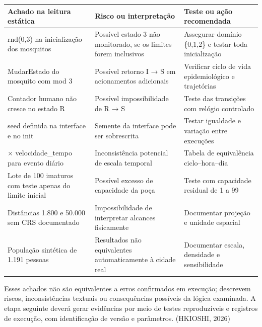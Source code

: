 \begin{longtable}[]{@{}
  >{\raggedright\arraybackslash}p{}
  >{\raggedright\arraybackslash}p{}
  >{\raggedright\arraybackslash}p{}@{}}
\toprule\noalign{}
\begin{minipage}[b]{\linewidth}\raggedright
\textbf{Achado na leitura estática}
\end{minipage} & \begin{minipage}[b]{\linewidth}\raggedright
\textbf{Risco ou interpretação}
\end{minipage} & \begin{minipage}[b]{\linewidth}\raggedright
\textbf{Teste ou ação recomendada}
\end{minipage} \\
\midrule\noalign{}
\endhead
\bottomrule\noalign{}
\endlastfoot
rnd(0,3) na inicialização dos mosquitos & Possível estado 3 não
monitorado, se os limites forem inclusivos & Assegurar domínio \{0,1,2\}
e testar toda inicialização \\
MudarEstado do mosquito com mod 3 & Possível retorno I → S em
acionamentos adicionais & Verificar ciclo de vida epidemiológico e
trajetórias \\
Contador humano não cresce no estado R & Possível impossibilidade de R →
S & Teste das transições com relógio controlado \\
seed definida na interface e no init & Semente da interface pode ser
sobrescrita & Testar igualdade e variação entre execuções \\
240 × velocidade\_tempo para evento diário & Inconsistência potencial de
escala temporal & Tabela de equivalência ciclo--hora--dia \\
Lote de 100 imaturos com teste apenas do limite inicial & Possível
excesso de capacidade da poça & Teste com capacidade residual de 1 a
99 \\
Distâncias 1.800 e 50.000 sem CRS documentado & Impossibilidade de
interpretar alcances fisicamente & Documentar projeção e unidade
espacial \\
População sintética de 1.191 pessoas & Resultados não equivalentes
automaticamente à cidade real & Documentar escala, densidade e
sensibilidade \\
\end{longtable}

Esses achados não são equivalentes a erros confirmados em execução;
descrevem riscos, inconsistências textuais ou consequências possíveis da
lógica examinada. A etapa seguinte deverá gerar evidências por meio de
testes reproduzíveis e registros de execução, com identificação de
versão e parâmetros. (HKIOSHI, 2026)

